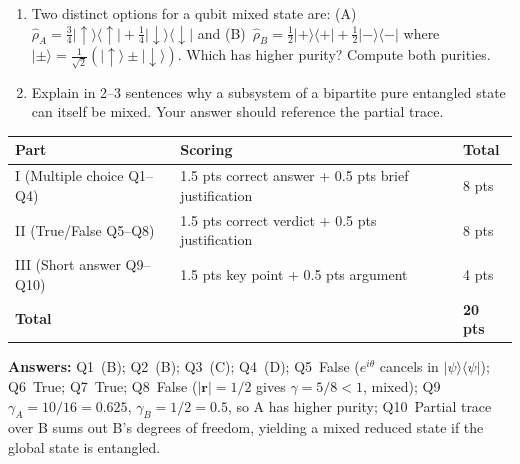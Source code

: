\documentclass[11pt,a4paper]{article}
\begin{document}
\begin{tcolorbox}[ugconceptbox, title={Part III --- Short Answer \hfill\normalfont 2 $\times$ 2 pts = 4 pts}]

\begin{enumerate}[leftmargin=1.8em, label=\textbf{Q\arabic*.}, itemsep=10pt, start=9]

\item {}
  Two distinct options for a qubit mixed state are:
  (A)~$\hat{\rho}_A=\tfrac{3}{4}|\uparrow\rangle\langle\uparrow|+\tfrac{1}{4}|\downarrow\rangle\langle\downarrow|$
  and
  (B)~$\hat{\rho}_B=\tfrac{1}{2}|{+}\rangle\langle{+}|+\tfrac{1}{2}|{-}\rangle\langle{-}|$
  where $|\pm\rangle=\tfrac{1}{\sqrt{2}}(|\uparrow\rangle\pm|\downarrow\rangle)$.
  Which has higher purity? Compute both purities.

  \vspace{2.5cm}

\item {}
  Explain in 2--3 sentences why a subsystem of a bipartite pure entangled
  state can itself be mixed. Your answer should reference the partial trace.

  \vspace{2.5cm}

\end{enumerate}
\end{tcolorbox}

\begin{tcolorbox}[rubricbox, title={SCQU Rubric}]
\begin{tabular}{lll}
\toprule
Part & Scoring & Total\\
\midrule
I (Multiple choice Q1--Q4)   & 1.5 pts correct answer + 0.5 pts brief justification & 8 pts\\
II (True/False Q5--Q8)       & 1.5 pts correct verdict + 0.5 pts justification & 8 pts\\
III (Short answer Q9--Q10)   & 1.5 pts key point + 0.5 pts argument & 4 pts\\
\midrule
\textbf{Total} & & \textbf{20 pts}\\
\bottomrule
\end{tabular}

\medskip\noindent
\textbf{Answers:} Q1~(B); Q2~(B); Q3~(C); Q4~(D);
Q5~False ($e^{i\theta}$ cancels in $|\psi\rangle\langle\psi|$);
Q6~True; Q7~True; Q8~False ($|\mathbf{r}|=1/2$ gives $\gamma=5/8<1$, mixed);
Q9~$\gamma_A=10/16=0.625$, $\gamma_B=1/2=0.5$, so A has higher purity;
Q10~Partial trace over B sums out B's degrees of freedom, yielding a mixed reduced state if the global state is entangled.
\end{tcolorbox}
\end{document}
